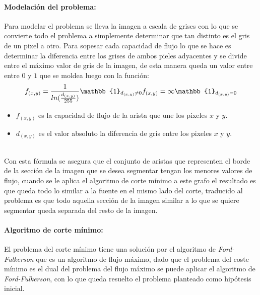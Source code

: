 \documentclass[a4paper,10pt,twocolumn]{article}
\begin{document}
\paragraph*{Modelaci\'on del problema:}
Para modelar el problema se lleva la imagen a escala de grises con lo que se convierte todo el problema a simplemente 
determinar que tan distinto es el gris de un pixel a otro. Para sopesar cada capacidad de flujo lo que se hace es determinar la
diferencia entre los grises de ambos pieles adyacentes y se divide entre el m\'aximo valor de gris de la imagen, de esta manera
queda un valor entre entre $0$ y $1$ que se moldea luego con la funci\'on:\\
\begin{equation}
	f_{(x,y)} = \frac{1}{ln(\frac{d_{(x,y)}}{255})} \mathbb{1}_{d_{(x,y)} \neq 0}\\
	f_{(x,y)} = \infty \mathbb{1}_{d_{(x,y)} = 0}
\end{equation}
\begin{itemize}
	\item $f_{(x,y)}$ es la capacidad de flujo de la arista que une los pixeles $x$ y $y$.
	\item $d_{(x,y)}$ es el valor absoluto la diferencia de gris entre los pixeles $x$ y $y$.
\end{itemize}

\\
Con esta f\'ormula se asegura que el conjunto de aristas que representen el borde de la secci\'on de la imagen que se desea segmentar 
tengan los menores valores de flujo, cuando se le aplica el algoritmo de corte m\'inimo a este grafo el resultado es que queda todo lo similar a la 
fuente en el mismo lado del corte, traducido al problema es que todo aquella secci\'on de la imagen similar a lo que se quiere segmentar queda
separada del resto de la imagen.\\

\paragraph*{Algoritmo de corte m\'inimo:}
El problema del corte m\'inimo tiene una soluci\'on por el algoritmo de \textit{Ford-Fulkerson} que es un algoritmo de flujo m\'aximo,
dado que el problema del coste m\'inimo es el dual del problema del flujo m\'aximo se puede aplicar el algoritmo de \textit{Ford-Fulkerson},
con lo que queda resuelto el problema planteado como hip\'otesis inicial.\\
\end{document}

